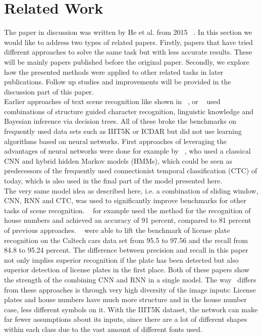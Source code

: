 \documentclass{utue} %
\begin{document}
\section{Related Work}
The paper in discussion was written by He et al. from 2015 ~\cite{2015arXiv150604395H}. In this section we would like to address two types of related papers. Firstly, papers that have tried different approaches to solve the same task but with less accurate results. These will be mainly papers published before the original paper. Secondly, we explore how the presented methods were applied to other related tasks in later publications. Follow up studies and improvements will be provided in the discussion part of this paper. \\
Earlier approaches of text scene recognition like shown in ~\cite{iiit5k}, or ~\cite{6727574} used combinations of structure guided character recognition, linguistic knowledge and Bayesian inference via decision trees. All of these broke the benchmarks on frequently used data sets such as IIIT5K or ICDAR but did not use learning algorithms based on neural networks. First approaches of leveraging the advantages of neural networks were done for example by ~\cite{DBLP:journals/corr/AlsharifP13}, who used a classical CNN and hybrid hidden Markov models (HMMs), which could be seen as predecessors of the frequently used connectionist temporal classification (CTC) of today, which is also used in the final part of the model presented here.\\
The very same model idea as described here, i.e. a combination of sliding window, CNN, RNN and CTC, was used to significantly improve benchmarks for other tasks of scene recognition. ~\cite{DBLP:journals/corr/GuoTLL16} for example used the method for the recognition of house numbers and achieved an accuracy of 91 percent, compared to 81 percent of previous approaches. ~\cite{DBLP:journals/corr/LiS16} were able to lift the benchmark of license plate recognition on the Caltech cars data set from 95.5 to 97.56 and the recall from 84.8 to 95.24 percent. The difference between precision and recall in this paper not only implies superior recognition if the plate has been detected but also superior detection of license plates in the first place. Both of these papers show the strength of the combining CNN and RNN in a single model. The way~\cite{2015arXiv150604395H} differs from these approaches is through very high diversity of the image inputs: License plates and house numbers have much more structure and in the house number case, less different symbols on it. With the IIIT5K dataset, the network can make far fewer assumptions about its inputs, since there are a lot of different shapes within each class due to the vast amount of different fonts used.
\end{document}
